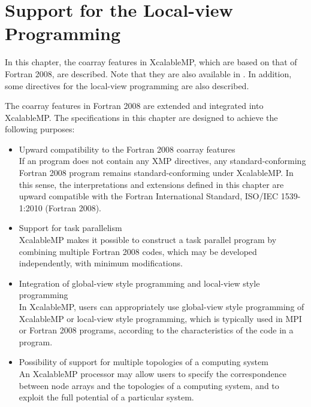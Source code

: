 \chapter{Support for the Local-view Programming}
\label{chap:Support for the Local-view Programming}

In this chapter, the coarray features in XcalableMP, which are based on
that of Fortran 2008, are described. Note that they are also available
in {\XMPC}. In addition, some directives for the local-view programming
are also described.


The coarray features in Fortran 2008 are extended and integrated into
XcalableMP. The specifications in this chapter are designed to achieve
the following purposes:

\begin{itemize}
 \item Upward compatibility to the Fortran 2008 coarray features\\
If an {\XMPF} program does not contain any XMP directives,
any standard-conforming Fortran 2008 program
remains standard-conforming under XcalableMP.
In this sense, the interpretations and extensions defined in this
 chapter are upward compatible with the Fortran International Standard, ISO/IEC 1539-1:2010 (Fortran 2008).

 \item Support for task parallelism \\
       XcalableMP makes it possible to construct a task parallel program by
       combining multiple Fortran 2008 codes, which may be developed
       independently, with minimum modifications.

 \item Integration of global-view style programming and local-view style programming\\
       In XcalableMP, users can appropriately use global-view style
       programming of 
       XcalableMP or local-view style programming, which is typically
       used in MPI or Fortran 2008 programs, according to
       the characteristics of the code in a program.

 \item Possibility of support for multiple topologies of a computing system\\
       An XcalableMP processor may allow users to specify the correspondence between 
       node arrays and the topologies of a computing system, and to
       exploit the full potential of a particular system.

\end{itemize}


